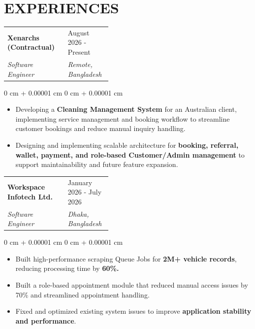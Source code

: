 \documentclass[10pt, letterpaper]{article}
\makeatletter
\newenvironment{highlights}{
    \begin{itemize}[
        topsep=0.10 cm,
        parsep=0.10 cm,
        partopsep=0pt,
        itemsep=0pt,
        leftmargin=0 cm + 10pt
    ]
}{
    \end{itemize}
} %
\newenvironment{onecolentry}{
    \begin{adjustwidth}{
        0 cm + 0.00001 cm
    }{
        0 cm + 0.00001 cm
    }
}{
    \end{adjustwidth}
} %
\newcommand{\experienceEntry}[4]{
    \noindent
    \begin{tabularx}{\linewidth}{@{}X>{\raggedleft\arraybackslash}p{0.42\linewidth}@{}}
        \textbf{#1} & #3 \\
        \textit{#2} & \textit{#4}
    \end{tabularx}
    \par
}
\makeatother
\begin{document}
    \section{EXPERIENCES}

    \experienceEntry{Xenarchs (Contractual)}{Software Engineer}{August 2026 - Present}{Remote, Bangladesh}
    \begin{onecolentry}
        \begin{highlights}
            \item Developing a \textbf{Cleaning Management System} for an Australian client, implementing service management and booking workflow to streamline customer bookings and reduce manual inquiry handling.
            \item Designing and implementing scalable architecture for \textbf{booking, referral, wallet, payment, and role-based Customer/Admin management} to support maintainability and future feature expansion.
        \end{highlights}
    \end{onecolentry}

    \vspace{0.25 cm}
    \experienceEntry{Workspace Infotech Ltd.}{Software Engineer}{January 2026 - July 2026}{Dhaka, Bangladesh}
    \begin{onecolentry}
        \begin{highlights}
            \item Built high-performance scraping Queue Jobs for \textbf{2M+ vehicle records}, reducing processing time by \textbf{60\%.}
            \item Built a role-based appointment module that reduced manual access issues by 70\% and streamlined appointment handling.
            \item Fixed and optimized existing system issues to improve \textbf{application stability and performance}.
        \end{highlights}
    \end{onecolentry}
\end{document}
